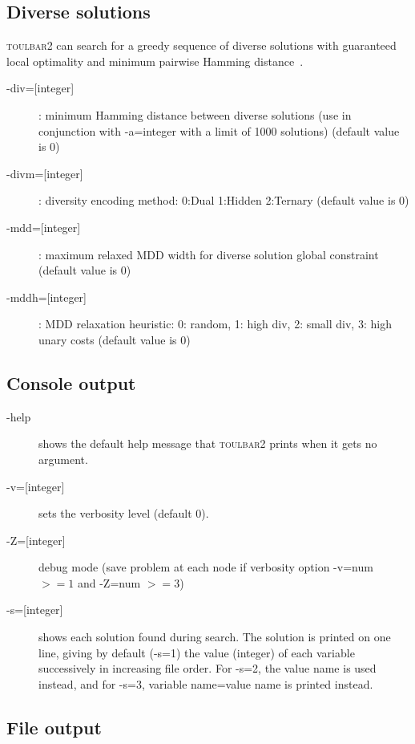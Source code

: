 \documentclass{article}
\def\toulbar2{\textsc{toulbar2}}
\begin{document}
\subsection{Diverse solutions}

\toulbar2 can search for a greedy sequence of diverse solutions with guaranteed local optimality and minimum pairwise Hamming distance~\cite{Ruffini19a}.

\begin{description}
\item[{-div=[integer]}] : minimum Hamming distance between diverse solutions (use in conjunction with -a=integer with a limit of 1000 solutions) (default value is 0)
\item[{-divm=[integer]}] : diversity encoding method: 0:Dual 1:Hidden 2:Ternary (default value is 0)
\item[{-mdd=[integer]}] : maximum relaxed MDD width for diverse solution global constraint (default value is 0)
\item[{-mddh=[integer]}] : MDD relaxation heuristic: 0: random, 1: high div, 2: small div, 3: high unary costs (default value is 0)
\end{description}

\subsection{Console output}

\begin{description}
\item[-help] shows the default help message that \toulbar2 prints when
  it gets no argument.
\item[{-v=[integer]}] sets the verbosity level (default 0).
\item[{-Z=[integer]}] debug mode (save problem at each node if verbosity
  option -v=num $>= 1$ and -Z=num $>=3$)
\item[{-s=[integer]}] shows each solution found during search. The solution is
  printed on one line, giving by default (-s=1) the value (integer) of each variable
  successively in increasing file order. For -s=2, the value name is used instead, and for -s=3, variable name=value name is printed instead.
\end{description}

\subsection{File output}
\end{document}

